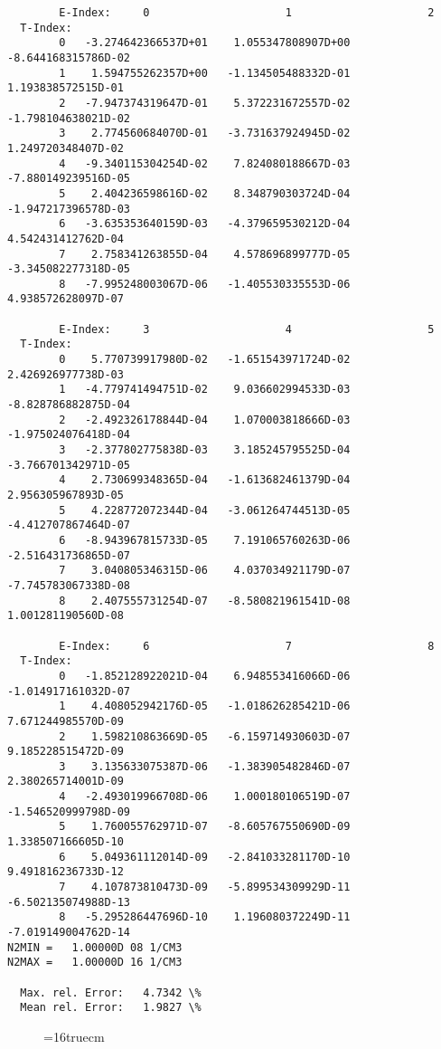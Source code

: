 \documentclass[12pt,dvipdfmx]{article}
\begin{document}
\begin{small}\begin{verbatim}
        E-Index:     0                     1                     2
  T-Index:
        0   -3.274642366537D+01    1.055347808907D+00   -8.644168315786D-02
        1    1.594755262357D+00   -1.134505488332D-01    1.193838572515D-01
        2   -7.947374319647D-01    5.372231672557D-02   -1.798104638021D-02
        3    2.774560684070D-01   -3.731637924945D-02    1.249720348407D-02
        4   -9.340115304254D-02    7.824080188667D-03   -7.880149239516D-05
        5    2.404236598616D-02    8.348790303724D-04   -1.947217396578D-03
        6   -3.635353640159D-03   -4.379659530212D-04    4.542431412762D-04
        7    2.758341263855D-04    4.578696899777D-05   -3.345082277318D-05
        8   -7.995248003067D-06   -1.405530335553D-06    4.938572628097D-07

        E-Index:     3                     4                     5
  T-Index:
        0    5.770739917980D-02   -1.651543971724D-02    2.426926977738D-03
        1   -4.779741494751D-02    9.036602994533D-03   -8.828786882875D-04
        2   -2.492326178844D-04    1.070003818666D-03   -1.975024076418D-04
        3   -2.377802775838D-03    3.185245795525D-04   -3.766701342971D-05
        4    2.730699348365D-04   -1.613682461379D-04    2.956305967893D-05
        5    4.228772072344D-04   -3.061264744513D-05   -4.412707867464D-07
        6   -8.943967815733D-05    7.191065760263D-06   -2.516431736865D-07
        7    3.040805346315D-06    4.037034921179D-07   -7.745783067338D-08
        8    2.407555731254D-07   -8.580821961541D-08    1.001281190560D-08

        E-Index:     6                     7                     8
  T-Index:
        0   -1.852128922021D-04    6.948553416066D-06   -1.014917161032D-07
        1    4.408052942176D-05   -1.018626285421D-06    7.671244985570D-09
        2    1.598210863669D-05   -6.159714930603D-07    9.185228515472D-09
        3    3.135633075387D-06   -1.383905482846D-07    2.380265714001D-09
        4   -2.493019966708D-06    1.000180106519D-07   -1.546520999798D-09
        5    1.760055762971D-07   -8.605767550690D-09    1.338507166605D-10
        6    5.049361112014D-09   -2.841033281170D-10    9.491816236733D-12
        7    4.107873810473D-09   -5.899534309929D-11   -6.502135074988D-13
        8   -5.295286447696D-10    1.196080372249D-11   -7.019149004762D-14
N2MIN =   1.00000D 08 1/CM3
N2MAX =   1.00000D 16 1/CM3

  Max. rel. Error:   4.7342 \%
  Mean rel. Error:   1.9827 \%
\end{verbatim}\end{small}
\begin{figure} \label{7.2.3b}
\epsfxsize=16truecm
\end{figure}
\newpage
\end{document}
